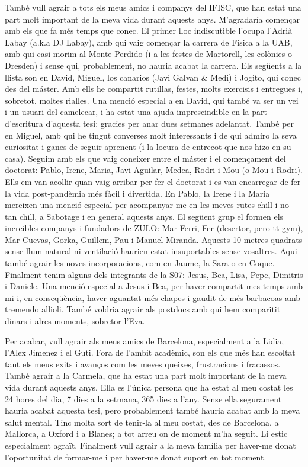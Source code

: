 També vull agrair a tots els meus amics i companys del IFISC, que han estat una
part molt important de la meva vida durant aquests anys. M'agradaría començar
amb els que fa més temps que conec. El primer lloc indiscutible l'ocupa l'Adrià
Labay (a.k.a DJ Labay), amb qui vaig començar la carrera de Física a la UAB,
amb qui casi morim al Monte Perdido (i a les festes de Martorell, les colònies
o Dresden) i sense qui, probablement, no hauria acabat la carrera. Els següents
a la llista son en David, Miguel, los canarios (Javi Galvan \& Medi) i Jogito,
qui conec des del máster. Amb ells he compartit rutillas, festes, molts
exercisis i entregues i, sobretot, moltes rialles. Una menció especial a en
David, qui també va ser un vei i un usuari del camelecar, i ha estat una ajuda
imprescindible en la part d'escritura d'aquesta tesi: gracies per anar dues
setmanes adelantat. També per en Miguel, amb qui he tingut converses molt
interessants i de qui admiro la seva curiositat i ganes de seguir aprenent (i
la locura de entrecot que nos hizo en su casa). Seguim amb els que vaig
coneixer entre el máster i el començament del doctorat: Pablo, Irene, Maria,
Javi Aguilar, Medea, Rodri i Mou (o Mou i Rodri). Ells em van acollir quan vaig
arribar per fer el doctorat i es van encarregar de fer la vida post-pandèmia
més fàcil i divertida. En Pablo, la Irene i la Maria mereixen una menció
especial per acompanyar-me en les meves rutes chill i no tan chill, a Sabotage
i en general aquests anys. El següent grup el formen els increibles companys i
fundadors de ZULO: Mar Ferri, Fer (desertor, pero tt gym), Mar Cuevas, Gorka,
Guillem, Pau i Manuel Miranda. Aquests 10 metres quadrats sense llum natural ni
ventilació haurien estat insuportables sense vosaltres. Aqui també agrair les
noves incorporacions, com en Jaume, la Sara o en Coque. Finalment tenim alguns
dels integrants de la S07: Jesus, Bea, Lisa, Pepe, Dimitris i Daniele. Una
menció especial a Jesus i Bea, per haver compartit mes temps amb mi i, en
conseqüència, haver aguantat més chapes i gaudit de més barbacoas amb tremendo
allioli. També voldria agrair als postdocs amb qui hem comparitit dinars i
alres moments, sobretor l'Eva.

Per acabar, vull agrair als meus amics de Barcelona, especialment a la Lidia,
l'Alex Jimenez i el Guti. Fora de l'ambit acadèmic, son els que més han
escoltat tant els meus exits i avanços com les meves queixes, frustracions i
fracassos. També agrair a la Carmela, que ha estat una part molt important de
la meva vida durant aquests anys. Ella es l'única persona que ha estat al meu
costat les 24 hores del dia, 7 dies a la setmana, 365 dies a l'any. Sense ella
segurament hauria acabat aquesta tesi, pero probablement també hauria acabat
amb la meva salut mental. Tinc molta sort de tenir-la al meu costat, des de
Barcelona, a Mallorca, a Oxford i a Blanes; a tot arreu on de moment m'ha
seguit. Li estic especialment agraït. Finalment vull agrair a la meva família
per haver-me donat l'oportunitat de formar-me i per haver-me donat suport en
tot moment.

\vfill
